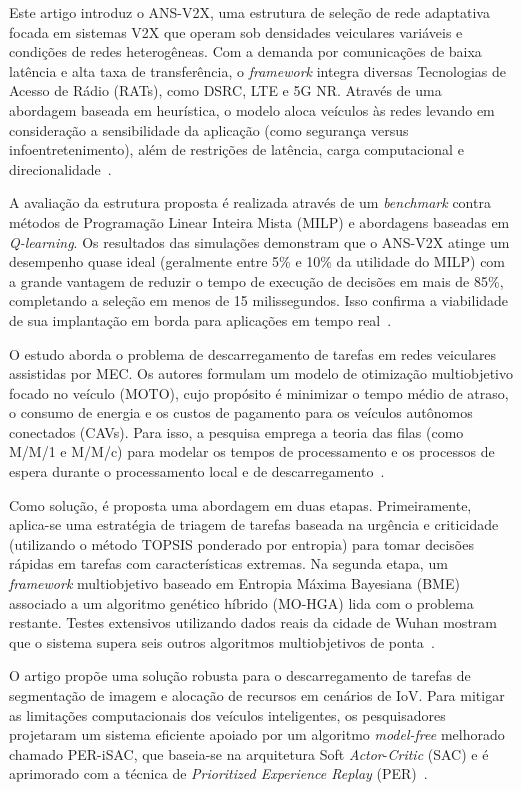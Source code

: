 Este artigo introduz o ANS-\gls{V2X}, uma estrutura de seleção de rede adaptativa focada em sistemas \gls{V2X} que operam sob densidades veiculares variáveis e condições de redes heterogêneas. Com a demanda por comunicações de baixa latência e alta taxa de transferência, o \textit{framework} integra diversas Tecnologias de Acesso de Rádio (RATs), como \gls{DSRC}, \gls{LTE} e \gls{5G} \gls{NR}. Através de uma abordagem baseada em heurística, o modelo aloca veículos às redes levando em consideração a sensibilidade da aplicação (como segurança versus infoentretenimento), além de restrições de latência, carga computacional e direcionalidade~\cite{haq2025}.

A avaliação da estrutura proposta é realizada através de um \textit{benchmark} contra métodos de Programação Linear Inteira Mista (MILP) e abordagens baseadas em \textit{\textit{Q-learning}}. Os resultados das simulações demonstram que o ANS-\gls{V2X} atinge um desempenho quase ideal (geralmente entre 5\% e 10\% da utilidade do MILP) com a grande vantagem de reduzir o tempo de execução de decisões em mais de 85\%, completando a seleção em menos de 15 milissegundos. Isso confirma a viabilidade de sua implantação em borda para aplicações em tempo real~\cite{haq2025}.


O estudo aborda o problema de descarregamento de tarefas em redes veiculares assistidas por \gls{MEC}. Os autores formulam um modelo de otimização multiobjetivo focado no veículo (MOTO), cujo propósito é minimizar o tempo médio de atraso, o consumo de energia e os custos de pagamento para os veículos autônomos conectados (CAVs). Para isso, a pesquisa emprega a teoria das filas (como M/M/1 e M/M/c) para modelar os tempos de processamento e os processos de espera durante o processamento local e de descarregamento~\cite{chen2025}.

Como solução, é proposta uma abordagem em duas etapas. Primeiramente, aplica-se uma estratégia de triagem de tarefas baseada na urgência e criticidade (utilizando o método \gls{TOPSIS} ponderado por entropia) para tomar decisões rápidas em tarefas com características extremas. Na segunda etapa, um \textit{framework} multiobjetivo baseado em Entropia Máxima Bayesiana (BME) associado a um algoritmo genético híbrido (MO-HGA) lida com o problema restante. Testes extensivos utilizando dados reais da cidade de Wuhan mostram que o sistema supera seis outros algoritmos multiobjetivos de ponta~\cite{chen2025}.

O artigo propõe uma solução robusta para o descarregamento de tarefas de segmentação de imagem e alocação de recursos em cenários de \gls{IoV}. Para mitigar as limitações computacionais dos veículos inteligentes, os pesquisadores projetaram um sistema eficiente apoiado por um algoritmo \textit{model-free} melhorado chamado PER-iSAC, que baseia-se na arquitetura Soft \textit{Actor}-\textit{Critic} (\gls{SAC}) e é aprimorado com a técnica de \textit{Prioritized Experience Replay} (PER)~\cite{zou2025}.

